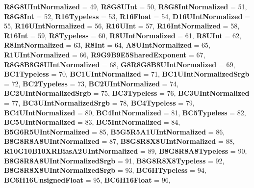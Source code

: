\begin{DoxyCompactItemize}
{\bfseries R8\+G8\+U\+Int\+Normalized} = 49, 
{\bfseries R8\+G8\+U\+Int} = 50, 
{\bfseries R8\+G8\+Int\+Normalized} = 51, 
{\bfseries R8\+G8\+Int} = 52, 
\newline
{\bfseries R16\+Typeless} = 53, 
{\bfseries R16\+Float} = 54, 
{\bfseries D16\+U\+Int\+Normalized} = 55, 
{\bfseries R16\+U\+Int\+Normalized} = 56, 
\newline
{\bfseries R16\+U\+Int} = 57, 
{\bfseries R16\+Int\+Normalized} = 58, 
{\bfseries R16\+Int} = 59, 
{\bfseries R8\+Typeless} = 60, 
\newline
{\bfseries R8\+U\+Int\+Normalized} = 61, 
{\bfseries R8\+U\+Int} = 62, 
{\bfseries R8\+Int\+Normalized} = 63, 
{\bfseries R8\+Int} = 64, 
\newline
{\bfseries A8\+U\+Int\+Normalized} = 65, 
{\bfseries R1\+U\+Int\+Normalized} = 66, 
{\bfseries R9\+G9\+B9\+E5\+Shared\+Exponent} = 67, 
{\bfseries R8\+G8\+B8\+G8\+U\+Int\+Normalized} = 68, 
\newline
{\bfseries G8\+R8\+G8\+B8\+U\+Int\+Normalized} = 69, 
{\bfseries B\+C1\+Typeless} = 70, 
{\bfseries B\+C1\+U\+Int\+Normalized} = 71, 
{\bfseries B\+C1\+U\+Int\+Normalized\+Srgb} = 72, 
\newline
{\bfseries B\+C2\+Typeless} = 73, 
{\bfseries B\+C2\+U\+Int\+Normalized} = 74, 
{\bfseries B\+C2\+U\+Int\+Normalized\+Srgb} = 75, 
{\bfseries B\+C3\+Typeless} = 76, 
\newline
{\bfseries B\+C3\+U\+Int\+Normalized} = 77, 
{\bfseries B\+C3\+U\+Int\+Normalized\+Srgb} = 78, 
{\bfseries B\+C4\+Typeless} = 79, 
{\bfseries B\+C4\+U\+Int\+Normalized} = 80, 
\newline
{\bfseries B\+C4\+Int\+Normalized} = 81, 
{\bfseries B\+C5\+Typeless} = 82, 
{\bfseries B\+C5\+U\+Int\+Normalized} = 83, 
{\bfseries B\+C5\+Int\+Normalized} = 84, 
\newline
{\bfseries B5\+G6\+R5\+U\+Int\+Normalized} = 85, 
{\bfseries B5\+G5\+R5\+A1\+U\+Int\+Normalized} = 86, 
{\bfseries B8\+G8\+R8\+A8\+U\+Int\+Normalized} = 87, 
{\bfseries B8\+G8\+R8\+X8\+U\+Int\+Normalized} = 88, 
\newline
{\bfseries R10\+G10\+B10\+X\+R\+Bias\+A2\+U\+Int\+Normalized} = 89, 
{\bfseries B8\+G8\+R8\+A8\+Typeless} = 90, 
{\bfseries B8\+G8\+R8\+A8\+U\+Int\+Normalized\+Srgb} = 91, 
{\bfseries B8\+G8\+R8\+X8\+Typeless} = 92, 
\newline
{\bfseries B8\+G8\+R8\+X8\+U\+Int\+Normalized\+Srgb} = 93, 
{\bfseries B\+C6\+H\+Typeless} = 94, 
{\bfseries B\+C6\+H16\+Unsigned\+Float} = 95, 
{\bfseries B\+C6\+H16\+Float} = 96, 

\end{DoxyCompactItemize}
